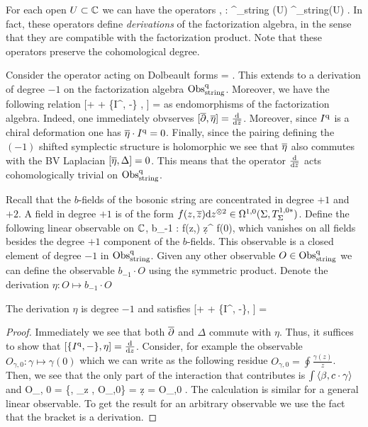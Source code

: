 For each open $U \subset \CC$ we can have the operators
\ben
{} , \frac{\d}{\d \zbar} : \Obs^\q_{\rm string} (U) \to \Obs^\q_{\rm string}(U) .
\een 
In fact, these operators define {\em derivations} of the factorization algebra, in the sense that they are compatible with the factorization product. 
Note that these operators preserve the cohomological degree. 

Consider the operator acting on Dolbeault forms
\ben
\Bar{\eta} = \frac{\partial}{\partial (\d \zbar)} .
\een 
This extends to a derivation of degree $-1$ on the factorization algebra $\Obs^\q_{\rm string}$. 
Moreover, we have the following relation
\be\label{d/dzbar}
[\dbar + \hbar \Delta + \{I^\q, -\} , \Bar{\eta}] =  \frac{\d}{\d \zbar}
\ee
as endomorphisms of the factorization algebra. 
Indeed, one immediately obvserves $[\dbar, \Bar{\eta}] =  \frac{\d}{\d \zbar}$. 
Moreover, since $I^\q$ is a chiral deformation one has $\Bar{\eta} \cdot I^\q = 0$. 
Finally, since the pairing defining the $(-1)$ shifted symplectic structure is holomorphic we see that $\Bar{\eta}$ also commutes with the BV Laplacian $[\Bar{\eta}, \Delta] = 0$. 
This means that the operator $\frac{\d}{\d \zbar}$ acts cohomologically trivial on $\Obs^\q_{\rm string}$. 

Recall that the $b$-fields of the bosonic string are concentrated in degree $+1$ and $+2$. 
A field in degree $+1$ is of the form $f(z,\zbar) \d z^{\tensor 2} \in \Omega^{1,0}(\Sigma, T_\Sigma^{1,0*})$. 
Define the following linear observable on $\CC$,
\ben
b_{-1} : f(z,\zbar) \d z^{} \mapsto f(0),
\een 
which vanishes on all fields besides the degree $+1$ component of the $b$-fields.
This observable is a closed element of degree $-1$ in $\Obs^\q_{\rm string}$. 
Given any other observable $O \in \Obs^{\q}_{\rm string}$ we can define the observable $b_{-1} \cdot O$ using the symmetric product.
Denote the derivation $\eta : O \mapsto b_{-1} \cdot O$

\begin{lem} 
The derivation $\eta$ is degree $-1$ and satisfies 
\be\label{d/dz}
[\dbar + \hbar \Delta + \{I^\q, -\}, \eta] = 
\ee
\end{lem}
\begin{proof} Immediately we see that both $\dbar$ and $\Delta$ commute with $\eta$. 
Thus, it suffices to show that $[\{I^\q, -\}, \eta] = \frac{\d}{\d z}$. 
Consider, for example the observable $O_{\gamma,0} : \gamma \mapsto \gamma (0)$ which we can write as the following residue $O_{\gamma,0} = \oint \frac{\gamma(z)}{z}$. 
Then, we see that the only part of the interaction that contributes is $\int \<\beta, c \cdot \gamma\>$ and 
 O_{\gamma, 0} = \{\int \<\beta, \partial_z \gamma\>, O_{\gamma,0}\} = \oint {} \d z =  O_{\gamma,0} .
\een
The calculation is similar for a general linear observable. 
To get the result for an arbitrary observable we use the fact that the bracket is a derivation. 
\end{proof}

